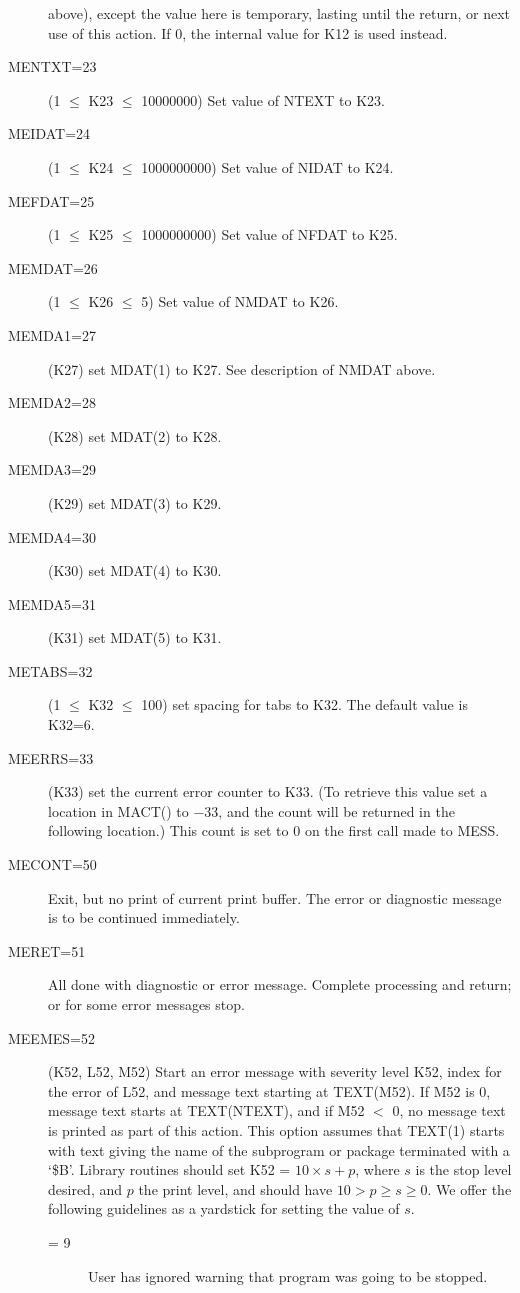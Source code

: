\documentclass[twoside]{MATH77}
\begin{document}
\begin{description}
  above), except the value here is temporary, lasting until the return,
  or next use of this action.  If 0, the internal value for K12 is used
  instead.
\item[MENTXT=23]  (1 $\leq $ K23 $\leq $ 10000000) Set value of NTEXT to K23.
\item[MEIDAT=24]  (1 $\leq $ K24 $\leq $ 1000000000) Set value of NIDAT to K24.
\item[MEFDAT=25]  (1 $\leq $ K25 $\leq $ 1000000000) Set value of NFDAT to K25.
\item[MEMDAT=26]  (1 $\leq $ K26 $\leq $ 5) Set value of NMDAT to K26.
\item[MEMDA1=27]  (K27) set MDAT(1) to K27.  See description of NMDAT above.
\item[MEMDA2=28]  (K28) set MDAT(2) to K28.
\item[MEMDA3=29]  (K29) set MDAT(3) to K29.
\item[MEMDA4=30]  (K30) set MDAT(4) to K30.
\item[MEMDA5=31]  (K31) set MDAT(5) to K31.
\item[METABS=32]  (1 $\leq $ K32 $\leq $ 100) set spacing for tabs to K32.
  The default value is K32=6.
\item[MEERRS=33] (K33) set the current error counter to K33.  (To retrieve
  this value set a location in MACT() to $-33$, and the count will be returned
  in the following location.)  This count is set to 0 on the first call made
  to MESS.
\item[MECONT=50]  Exit, but no print of current print buffer.  The error or
  diagnostic message is to be continued immediately.
\item[MERET=51] All done with diagnostic or error message.  Complete
  processing and return; or for some error messages stop.
\item[MEEMES=52]  (K52, L52, M52) Start an error message with severity level
  K52, index for the error of L52, and message text starting
  at TEXT(M52).  If M52 is 0, message text starts at
  TEXT(NTEXT), and if M52 $<$ 0, no message text is
  printed as part of this action.  This option assumes that TEXT(1) starts
  with text giving the name of the subprogram or package terminated with a
  `\$B'.  Library routines should set K52 = $10\times s + p$, where $s$ is
  the stop level desired, and $p$ the print level, and should have
  $10 > p \geq s \geq 0.$
  We offer the following guidelines as a yardstick for
  setting the value of $s$.
\begin{description}
\item[= 9]  User has ignored warning that program was going to be stopped.

\end{description}
\end{description}
\end{document}

